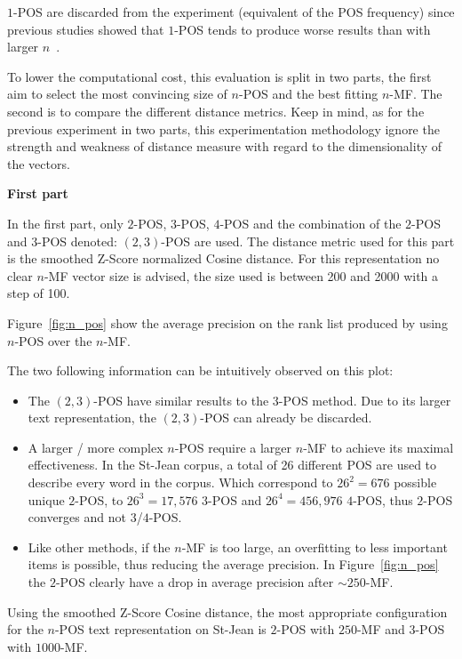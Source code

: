 $1$-POS are discarded from the experiment (equivalent of the POS frequency) since previous studies showed that $1$-POS tends to produce worse results than with larger $n$~\cite{kocher_linking}.

To lower the computational cost, this evaluation is split in two parts, the first aim to select the most convincing size of $n$-POS and the best fitting $n$-MF.
The second is to compare the different distance metrics.
Keep in mind, as for the previous experiment in two parts, this experimentation methodology ignore the strength and weakness of distance measure with regard to the dimensionality of the vectors.

\textbf{First part}

In the first part, only $2$-POS, $3$-POS, $4$-POS and the combination of the $2$-POS and $3$-POS denoted: $(2, 3)$-POS are used.
The distance metric used for this part is the smoothed Z-Score normalized Cosine distance.
For this representation no clear $n$-MF vector size is advised, the size used is between 200 and 2000 with a step of 100.

Figure~\ref{fig:n_pos} show the average precision on the rank list produced by using $n$-POS over the $n$-MF.

The two following information can be intuitively observed on this plot:
\begin{itemize}
  \item
  The $(2, 3)$-POS have similar results to the $3$-POS method.
  Due to its larger text representation, the $(2, 3)$-POS can already be discarded.
  \item
  A larger / more complex $n$-POS require a larger $n$-MF to achieve its maximal effectiveness.
  In the St-Jean corpus, a total of 26 different POS are used to describe every word in the corpus.
  Which correspond to $26^2 = 676$ possible unique $2$-POS, to $26^3 = 17,576$ $3$-POS and $26^4 = 456,976$ $4$-POS, thus $2$-POS converges and not $3$/$4$-POS.
  \item
  Like other methods, if the $n$-MF is too large, an overfitting to less important items is possible, thus reducing the average precision.
  In Figure~\ref{fig:n_pos} the $2$-POS clearly have a drop in average precision after $\sim 250$-MF.
\end{itemize}

Using the smoothed Z-Score Cosine distance, the most appropriate configuration for the $n$-POS text representation on St-Jean is $2$-POS with $250$-MF and $3$-POS with $1000$-MF.

